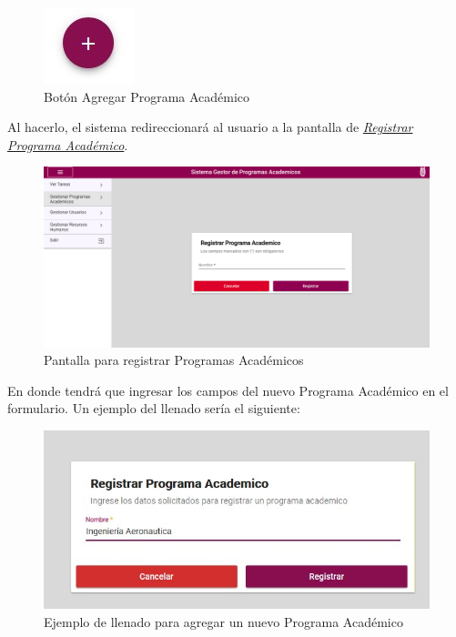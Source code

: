             \begin{figure}[!hbtp]
                \centering
                \hypertarget{add}{\includegraphics[width=0.7\linewidth]{images/SP3/BtnAgregar}}
                \caption{Botón Agregar Programa Académico}
                \label{add}
            \end{figure}

            Al hacerlo, el sistema redireccionará al usuario a la pantalla de \hyperlink{registrarpa}{\textit{Registrar Programa Académico}}.

        \begin{figure}[!hbtp]
            \centering
            \hypertarget{registrarpa}{\includegraphics[width=0.7\linewidth]{images/SP3/RegistrarPA}}
            \caption{Pantalla para registrar Programas Académicos}
            \label{registrarpa}
        \end{figure}

        En donde tendrá que ingresar los campos del nuevo Programa Académico en el formulario. Un ejemplo del llenado sería el siguiente:

        \begin{figure}[!hbtp]
            \centering
            \hypertarget{ejreg}{\includegraphics[width=0.7\linewidth]{images/SP3/Llenado}}
            \caption{Ejemplo de llenado para agregar un nuevo Programa Académico}
            \label{ejreg}
        \end{figure}

